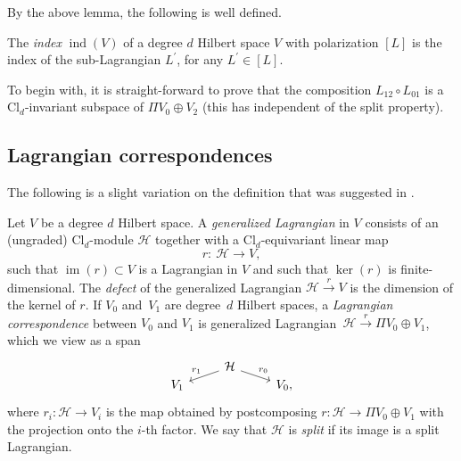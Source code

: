 \documentclass[10pt,a4paper]{amsart}
\numberwithin{equation}{section}
\DeclareMathOperator{\im}{\mathrm{im}}
\newcommand{\ind}{\operatorname{ind}}
\newcommand{\Cl}{\mathrm{Cl}}
\begin{document}
By the above lemma, the following is well defined.

\begin{Definition} \label{DefinitionIndexHilbertSpace}
The \emph{index} $\ind(V)$ of a degree $d$ Hilbert space $V$ with polarization $[L]$ is the index of the sub-Lagrangian $L^\prime$, for any $L^\prime \in [L]$.
\end{Definition}

To begin with, it is straight-forward to prove that the composition $L_{12} \circ L_{01}$ is a $\Cl_d$-invariant subspace of $\Pi V_0 \oplus V_2$ (this has independent of the split property).

\subsection{Lagrangian correspondences}

The following is a slight variation on the definition that was suggested in \cite[Definition~2.2.9]{StolzTeichnerElliptic}.

\begin{Definition}
\label{DefinitionGeneralizedLagrangians}
Let $V$ be a degree $d$ Hilbert space.
A \emph{generalized Lagrangian} in $V$ consists of an (ungraded) $\Cl_{d}$-module $\mathcal{H}$ together with a $\Cl_d$-equivariant linear map
\begin{equation*}
r\colon\ \mathcal{H} \longrightarrow V,
\end{equation*}
such that $\im(r) \subset V$ is a Lagrangian in $V$ and such that $\ker(r)$ is finite-dimensional.
The \emph{defect} of the generalized Lagrangian $\mathcal{H} \stackrel{r}{\to} V$ is the dimension of the kernel of $r$.
If $V_0$ and~$V_1$ are degree~$d$ Hilbert spaces, a \emph{Lagrangian correspondence} between $V_0$ and $V_1$ is generalized Lagrangian~${\mathcal{H} \stackrel{r}{\to} \Pi V_0 \oplus V_1}$, which we view as a span
\begin{equation*}
\begin{tikzcd}[row sep = 0.2mm]
 & \mathcal{H} \ar[dl, "r_1"'] \ar[dr, "r_0"] &\\
 V_1 & & V_0,
\end{tikzcd}
\end{equation*}
 where $r_i \colon \mathcal{H} \to V_i$ is the map obtained by postcomposing $r\colon \mathcal{H} \to \Pi V_0 \oplus V_1$ with the projection onto the $i$-th factor.
 We say that $\mathcal{H}$ is \emph{split} if its image is a split Lagrangian.
\end{Definition}
\end{document}
